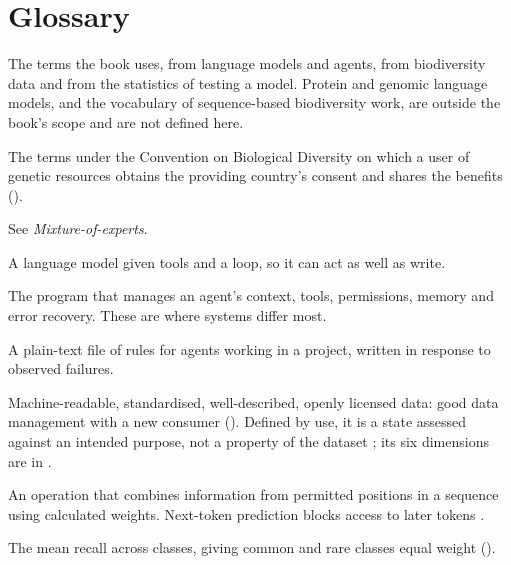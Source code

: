 \chapter{Glossary}
\label{app:glossary}

The terms the book uses, from language models and agents, from biodiversity
data and from the statistics of testing a model. Protein and genomic language
models, and the vocabulary of sequence-based biodiversity work, are outside
the book's scope and are not defined here.

\begin{description}[itemsep=0.2em]

\item[Access and benefit-sharing (ABS)] The terms under the Convention on
  Biological Diversity on which a user of genetic resources obtains the
  providing country's consent and shares the benefits
  \parencite{scholz2022dsi} ().

\item[Active parameters] See \emph{Mixture-of-experts}.

\item[Agent] A language model given tools and a loop, so it can act as well as
  write.

\item[Agent harness] The program that manages an agent's context, tools,
  permissions, memory and error recovery. These are where systems differ most.

\item[AGENTS.md / CLAUDE.md] A plain-text file of rules for agents working in a
  project, written in response to observed failures.

\item[AI-ready] Machine-readable, standardised, well-described, openly licensed
  data: good data management with a new consumer ().
  Defined by use, it is a state assessed against an intended purpose, not a
  property of the dataset \parencite{legner2026aireadydata}; its six
  dimensions are in .

\item[Attention] An operation that combines information from permitted
  positions in a sequence using calculated weights. Next-token prediction
  blocks access to later tokens \parencite{vaswani2017attention}.

\item[Balanced accuracy] The mean recall across classes, giving common and
  rare classes equal weight ().


\end{description}

